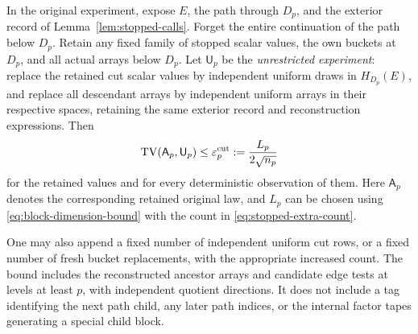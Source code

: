 \begin{lemma}\label{lem:cut-tv}
In the original experiment, expose $E$, the path through $D_p$, and the
exterior record of Lemma~\ref{lem:stopped-calls}.  Forget the entire
continuation of the path below $D_p$.  Retain any fixed family of stopped
scalar values, the own buckets at $D_p$, and all actual arrays below $D_p$.
Let $\mathsf U_p$ be the \emph{unrestricted experiment}: replace the retained
cut scalar values by independent uniform draws in $H_{D_p}(E)$, and replace
all descendant arrays by independent uniform arrays in their respective
spaces, retaining the same exterior record and reconstruction expressions.
Then
\begin{equation}\label{eq:cut-tv-bound}
 \operatorname{TV}(\mathsf A_p,\mathsf U_p)\le
 \varepsilon_p^{\mathrm{cut}}:=\frac{L_p}{2\sqrt{n_p}}
\end{equation}
for the retained values and for every deterministic observation of them.
Here $\mathsf A_p$ denotes the corresponding retained original law, and
$L_p$ can be chosen using \eqref{eq:block-dimension-bound} with the count in
\eqref{eq:stopped-extra-count}.

One may also append a fixed number of independent uniform cut rows, or a
fixed number of fresh bucket replacements, with the appropriate increased
count.  The bound includes the reconstructed ancestor arrays and candidate
edge tests at levels at least $p$, with independent quotient directions.
It does not include a tag identifying the next path child, any later path
indices, or the internal factor tapes generating a special child block.
\end{lemma}

